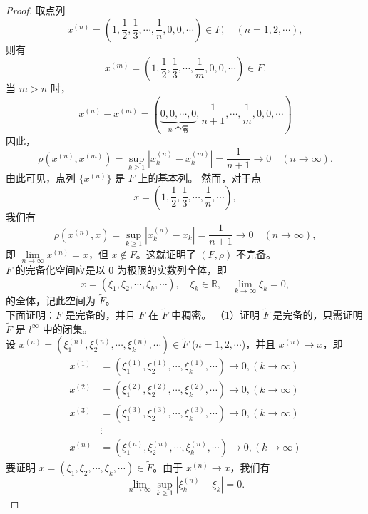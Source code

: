 \documentclass[lang=cn,newtx,10pt,scheme=chinese,thmcnt=chapter]{elegantbook}
\begin{document}
\begin{proof}
取点列
\[
x^{(n)} = \left( 1, \frac{1}{2}, \frac{1}{3}, \cdots, \frac{1}{n}, 0, 0, \cdots \right) \in F, \quad (n = 1, 2, \cdots),
\]
则有
\[
x^{(m)} = \left( 1, \frac{1}{2}, \frac{1}{3}, \cdots, \frac{1}{m}, 0, 0, \cdots \right) \in F.
\]
当 \( m > n \) 时，\[
x^{(n)} - x^{(m)} = \left(\underbrace{0, 0, \cdots,0}_{n \text{ 个零}} , \frac{1}{n+1}, \cdots, \frac{1}{m} , 0, 0, \cdots  \right)
\]
因此，
\[
\rho\left( x^{(n)}, x^{(m)} \right) = \sup_{k \geqslant 1} \left| x_k^{(n)} - x_k^{(m)} \right| = \frac{1}{n+1} \rightarrow 0 \quad (n \rightarrow \infty).
\]
由此可见，点列 \( \{ x^{(n)} \} \) 是 \( F \) 上的基本列。 然而，对于点
\[
x = \left( 1, \frac{1}{2}, \frac{1}{3}, \cdots, \frac{1}{n}, \cdots \right),
\]
我们有
\[
\rho\left( x^{(n)}, x \right) = \sup_{k \geqslant 1} \left| x_k^{(n)} - x_k \right| = \frac{1}{n+1} \rightarrow 0 \quad (n \rightarrow \infty),
\]
即 \( \lim\limits_{n \rightarrow \infty} x^{(n)} = x \)，但 \( x \notin F \)。这就证明了 \( (F, \rho) \) 不完备。\\
\( F \) 的完备化空间应是以 0 为极限的实数列全体，即
\[
x = \left( \xi_1, \xi_2, \cdots, \xi_k, \cdots \right), \quad \xi_k \in \mathbb{R}, \quad \lim_{k \to \infty} \xi_k = 0,
\]
的全体，记此空间为 \( \widetilde{F} \)。\\
下面证明：\( \widetilde{F} \) 是完备的，并且 \( F \) 在 \( \widetilde{F} \) 中稠密。
（1）证明 \( \widetilde{F} \) 是完备的，只需证明 \( \widetilde{F} \) 是 \( l^\infty \) 中的闭集。\\
设 \( x^{(n)} = \left( \xi_1^{(n)}, \xi_2^{(n)}, \cdots, \xi_k^{(n)}, \cdots \right) \in \widetilde{F} \) (\( n = 1, 2, \cdots \))，并且 \( x^{(n)} \to x \)，即
\[
\begin{aligned}
x^{(1)} &= \left( \xi_1^{(1)}, \xi_2^{(1)}, \cdots, \xi_k^{(1)}, \cdots \right) \to 0,(k\to \infty) \\
x^{(2)} &= \left( \xi_1^{(2)}, \xi_2^{(2)}, \cdots, \xi_k^{(2)}, \cdots \right) \to 0,(k\to \infty)  \\
x^{(3)} &= \left( \xi_1^{(3)}, \xi_2^{(3)}, \cdots, \xi_k^{(3)}, \cdots \right) \to 0,(k\to \infty)  \\
& \vdots \\
x^{(n)} &= \left( \xi_1^{(n)}, \xi_2^{(n)}, \cdots, \xi_k^{(n)}, \cdots \right) \to 0,(k\to \infty) 
\end{aligned}
\]
要证明 \( x = \left( \xi_1, \xi_2, \cdots, \xi_k, \cdots \right) \in \widetilde{F} \)。由于 \( x^{(n)} \to x \)，我们有
\[
\lim_{n \to \infty} \sup_{k \geqslant 1} \left| \xi_k^{(n)} - \xi_k \right| = 0.
\]
\end{proof}
\end{document}
